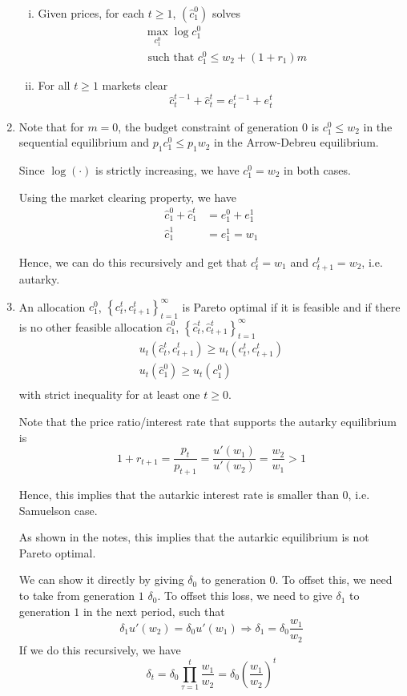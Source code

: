 \documentclass[12pt]{article}
\theoremstyle{definition}
\newcommand\st{\text{ such that }}
\newcommand{\cbra}[1]{\left\{#1\right\}}
\begin{document}
\begin{enumerate}[(1)]
\begin{enumerate}[(i)]
	\item Given prices, for each $t\geq 1$, $(\hat{c}_1^0)$ solves
	\begin{align*}
	& \max_{{c}_1^0} \log{c}_1^0\\
	& \st {c}_1^0  \leq w_2 +(1+r_1)m
	\end{align*}
	
	\item For all $t\geq 1$ markets clear
	\[
	\hat{c}_t^{t-1}+ \hat{c}_{t}^t = e_t^{t-1}+e_t^t
	\]
\end{enumerate}

\item

Note that for $m=0$, the budget constraint of generation $0$ is ${c}_1^0  \leq w_2$ in the sequential equilibrium and $p_1{c}_1^0  \leq p_1w_2$ in the Arrow-Debreu equilibrium.

Since $\log(\cdot)$ is strictly increasing, we have ${c}_1^0 =w_2$ in both cases.

Using the market clearing property, we have
\begin{align*}
\hat{c}_1^{0}+ \hat{c}_{1}^t & = e_1^{0}+e_1^1 \\
\hat{c}_{1}^1 & = e_1^1 =w_1
\end{align*}

Hence, we can do this recursively and get that $c_{t}^t=w_1$ and $c_{t+1}^t=w_2$, i.e. autarky.

\item
An allocation ${c}_1^0$, $\cbra{{c}_t^t, {c}_{t+1}^t}_{t=1}^\infty$ is Pareto optimal if it is feasible and if there is no other feasible allocation $\hat{c}_1^0$, $\cbra{\hat{c}_t^t, \hat{c}_{t+1}^t}_{t=1}^\infty$
\begin{align*}
	u_t(\hat{c}_t^t, \hat{c}_{t+1}^t)\geq u_t({c}_t^t, {c}_{t+1}^t)\\
	u_t(\hat{c}_1^0)\geq u_t({c}_1^0)\\
\end{align*}
with strict inequality for at least one $t \geq 0$.

Note that the price ratio/interest rate that supports the autarky equilibrium is
\[
1+r_{t+1}=\frac{p_t}{p_{t+1}} = \frac{u'(w_1)}{u'(w_2)} = \frac{w_2}{w_1}>1
\]

Hence, this implies that the autarkic interest rate is smaller than $0$, i.e. Samuelson case.

As shown in the notes, this implies that the autarkic equilibrium is not Pareto optimal.

We can show it directly by giving $\delta_0$ to generation $0$. To offset this, we need to take from generation $1$  $\delta_0$. To offset this loss, we need to give $\delta_1$ to generation $1$ in the next period, such that
\[
\delta_1 u'(w_2) = \delta_0 u'(w_1) \Rightarrow \delta_1 = \delta_0 \frac{w_1}{w_2}
\]
If we do this recursively, we have
\[
\delta_t = \delta_0 \prod_{\tau=1}^{t} \frac{w_1}{w_2} = \delta_0 \left( \frac{w_1}{w_2}\right) ^t
\]


\end{enumerate}
\end{document}
